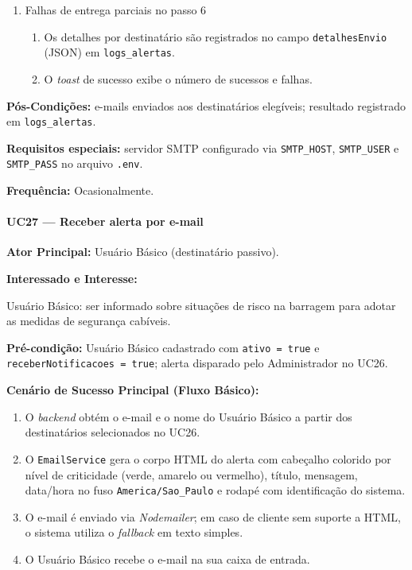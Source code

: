 \begin{enumerate}
  \renewcommand{\theenumi}{6a}
  \renewcommand{\labelenumi}{\theenumi.}
  \item Falhas de entrega parciais no passo 6
  \begin{enumerate}
  \item Os detalhes por destinatário são registrados
        no campo \texttt{detalhesEnvio} (JSON) em
        \texttt{logs\_alertas}.
  \item O \textit{toast} de sucesso exibe o número de
        sucessos e falhas.
  \end{enumerate}
\end{enumerate}

\textbf{Pós-Condições:} e-mails enviados aos destinatários
elegíveis; resultado registrado em \texttt{logs\_alertas}.

\textbf{Requisitos especiais:} servidor SMTP configurado
via \texttt{SMTP\_HOST}, \texttt{SMTP\_USER} e
\texttt{SMTP\_PASS} no arquivo \texttt{.env}.

\textbf{Frequência:} Ocasionalmente.

\paragraph{UC27 --- Receber alerta por e-mail}\hfill\break

\textbf{Ator Principal:} Usuário Básico (destinatário passivo).

\textbf{Interessado e Interesse:}

Usuário Básico: ser informado sobre situações de risco na
barragem para adotar as medidas de segurança cabíveis.

\textbf{Pré-condição:} Usuário Básico cadastrado com
\texttt{ativo = true} e \\ \texttt{receberNotificacoes = true};
alerta disparado pelo Administrador no UC26.

\textbf{Cenário de Sucesso Principal (Fluxo Básico):}
\begin{enumerate}
  \item O \textit{backend} obtém o e-mail e o nome do
        Usuário Básico a partir dos destinatários
        selecionados no UC26.
  \item O \texttt{EmailService} gera o corpo HTML do
        alerta com cabeçalho colorido por nível de
        criticidade (verde, amarelo ou vermelho), título,
        mensagem, data/hora no fuso
        \texttt{America/Sao\_Paulo} e rodapé com
        identificação do sistema.
  \item O e-mail é enviado via \textit{Nodemailer};
        em caso de cliente sem suporte a HTML, o sistema
        utiliza o \textit{fallback} em texto simples.
  \item O Usuário Básico recebe o e-mail na sua caixa
        de entrada.
\end{enumerate}

